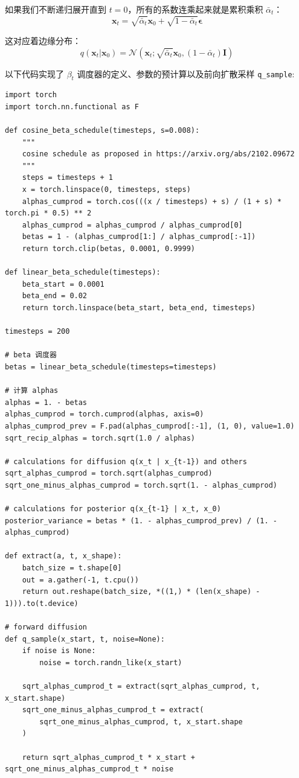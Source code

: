 \documentclass[zihao=-4, fontset=windows]{ctexart}
\begin{document}
如果我们不断递归展开直到 $t=0$，所有的系数连乘起来就是累积乘积 $\bar{\alpha}_t$：
\begin{equation}
\mathbf{x}_{t} =\sqrt{\bar{\alpha}_{t}} \mathbf{x}_{0}+\sqrt{1-\bar{\alpha}_{t}} \boldsymbol{\epsilon}
\end{equation}

这对应着边缘分布：
\begin{equation}
q(\mathbf{x}_{t} | \mathbf{x}_{0})=\mathcal{N}(\mathbf{x}_{t} ; \sqrt{\bar{\alpha}_{t}} \mathbf{x}_{0},(1-\bar{\alpha}_{t}) \mathbf{I})
\end{equation}

以下代码实现了 $\beta_t$ 调度器的定义、参数的预计算以及前向扩散采样 \texttt{q_sample}:

\begin{verbatim}
import torch
import torch.nn.functional as F

def cosine_beta_schedule(timesteps, s=0.008):
    """
    cosine schedule as proposed in https://arxiv.org/abs/2102.09672
    """
    steps = timesteps + 1
    x = torch.linspace(0, timesteps, steps)
    alphas_cumprod = torch.cos(((x / timesteps) + s) / (1 + s) * torch.pi * 0.5) ** 2
    alphas_cumprod = alphas_cumprod / alphas_cumprod[0]
    betas = 1 - (alphas_cumprod[1:] / alphas_cumprod[:-1])
    return torch.clip(betas, 0.0001, 0.9999)

def linear_beta_schedule(timesteps):
    beta_start = 0.0001
    beta_end = 0.02
    return torch.linspace(beta_start, beta_end, timesteps)

timesteps = 200

# beta 调度器
betas = linear_beta_schedule(timesteps=timesteps)

# 计算 alphas
alphas = 1. - betas
alphas_cumprod = torch.cumprod(alphas, axis=0)
alphas_cumprod_prev = F.pad(alphas_cumprod[:-1], (1, 0), value=1.0)
sqrt_recip_alphas = torch.sqrt(1.0 / alphas)

# calculations for diffusion q(x_t | x_{t-1}) and others
sqrt_alphas_cumprod = torch.sqrt(alphas_cumprod)
sqrt_one_minus_alphas_cumprod = torch.sqrt(1. - alphas_cumprod)

# calculations for posterior q(x_{t-1} | x_t, x_0)
posterior_variance = betas * (1. - alphas_cumprod_prev) / (1. - alphas_cumprod)

def extract(a, t, x_shape):
    batch_size = t.shape[0]
    out = a.gather(-1, t.cpu())
    return out.reshape(batch_size, *((1,) * (len(x_shape) - 1))).to(t.device)

# forward diffusion
def q_sample(x_start, t, noise=None):
    if noise is None:
        noise = torch.randn_like(x_start)

    sqrt_alphas_cumprod_t = extract(sqrt_alphas_cumprod, t, x_start.shape)
    sqrt_one_minus_alphas_cumprod_t = extract(
        sqrt_one_minus_alphas_cumprod, t, x_start.shape
    )

    return sqrt_alphas_cumprod_t * x_start + sqrt_one_minus_alphas_cumprod_t * noise
\end{verbatim}
\end{document}
